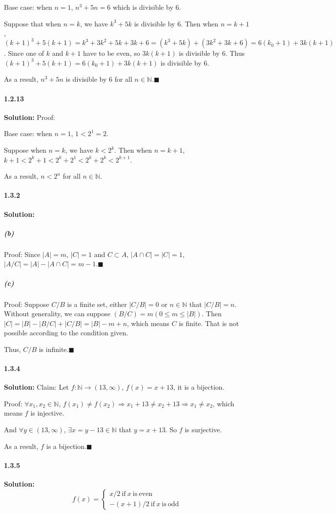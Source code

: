 \documentclass[11pt]{article}
\begin{document}
	Base case: when $n = 1$, $n^3 + 5n = 6$ which is divisible by $6$.
	
	Suppose that when $n = k$, we have $k^3 + 5k$ is divisible by $6$. Then when $n = k + 1$, $(k + 1)^3 + 5(k + 1) = k^3 + 3 k^2 + 5 k + 3k + 6 = (k^3 + 5k) + (3k^2 + 3k + 6) = 6(k_0 + 1) + 3k(k + 1)$. Since one of $k$ and $k + 1$ have to be even, so $3k(k + 1)$ is divisible by $6$. Thus $(k + 1)^3 + 5(k + 1) = 6(k_0 + 1) + 3k(k + 1)$ is divisible by $6$.
	
	As a result, $n^3 + 5n$ is divisible by $6$ for all $n \in \mathbb{N}$.$\blacksquare$
\paragraph{1.2.13}\textbf{Solution:}
	Proof:
	
	Base case: when $n = 1$, $1 < 2^1 = 2$.
	
	Suppose when $n = k$, we have $k < 2^k$. Then when $n = k + 1$, $k + 1 < 2^k + 1 < 2^k + 2^1 < 2^k + 2^k < 2^{k + 1}$.
	
	As a result, $n < 2^n$ for all $n \in \mathbb{N}$.
	
\paragraph{1.3.2}\textbf{Solution:}
	\subparagraph{(b)} Proof:
		Since $|A| = m$, $|C| = 1$ and $C \subset A$, $|A \cap C| = |C| = 1$, $|A/C| = |A| - |A \cap C| = m - 1$.$\blacksquare$
	\subparagraph{(c)} Proof:
		Suppose $C\slash B$ is a finite set, either $|C\slash B| = 0$ or $n \in \mathbb{N}$ that $|C\slash B| = n$. Without generality, we can suppose $(B \slash C) = m(0 \leq m \leq |B|)$. Then $|C| = |B| - |B \slash C| + |C \slash B| = |B| - m + n$, which means $C$ is finite. That is not possible according to the condition given.
		
		Thus, $C\slash B$ is infinite.$\blacksquare$ 
\paragraph{1.3.4}\textbf{Solution:}
	Claim: Let $f: \mathbb{N} \rightarrow (13, \infty)$, $f(x) = x + 13$, it is a bijection.
	
	Proof: $\forall x_1, x_2 \in \mathbb{N}$, $f(x_1) \neq f(x_2) \Rightarrow x_1 + 13 \neq x_2 + 13 \Rightarrow x_1 \neq x_2$, which means $f$ is injective.
	
	And $\forall y \in (13, \infty)$, $\exists x = y - 13 \in \mathbb{N}$ that $y = x + 13$. So $f$ is surjective.
	
	As a result, $f$ is a bijection.$\blacksquare$
		
\paragraph{1.3.5}\textbf{Solution:}
	\[
		f(x) = 
		\begin{cases}
			x / 2 \mathrm{\ if\ }x\mathrm{\ is\ even}\\
			-(x + 1) / 2 \mathrm{\ if\ }x\mathrm{\ is\ odd}
		\end{cases}
	\]
\end{document}
